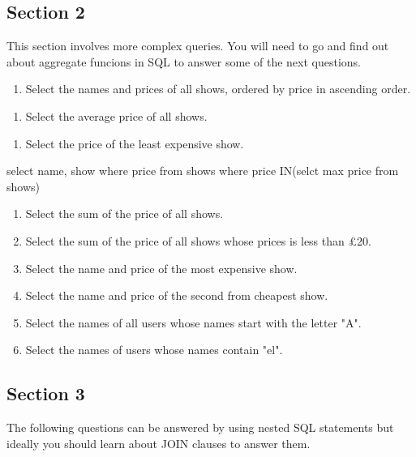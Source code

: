 \documentclass[11pt]{article}
\begin{document}
\subsection{Section 2}
\label{sec-2-2}

This section involves more complex queries. You will need to go and find
out about aggregate funcions in SQL to answer some of the next
questions.

\begin{enumerate}
\item Select the names and prices of all shows, ordered by price in
ascending order.
\end{enumerate}


\begin{enumerate}
\item Select the average price of all shows.
\end{enumerate}


\begin{enumerate}
\item Select the price of the least expensive show.
\end{enumerate}

select name, show where price from shows where price IN(selct max price from shows)

\begin{enumerate}
\item Select the sum of the price of all shows.

\item Select the sum of the price of all shows whose prices is less than
£20.

\item Select the name and price of the most expensive show.

\item Select the name and price of the second from cheapest show.

\item Select the names of all users whose names start with the letter "A".

\item Select the names of users whose names contain "el".
\end{enumerate}

\subsection{Section 3}
\label{sec-2-3}

The following questions can be answered by using nested SQL statements
but ideally you should learn about JOIN clauses to answer them.
\end{document}
